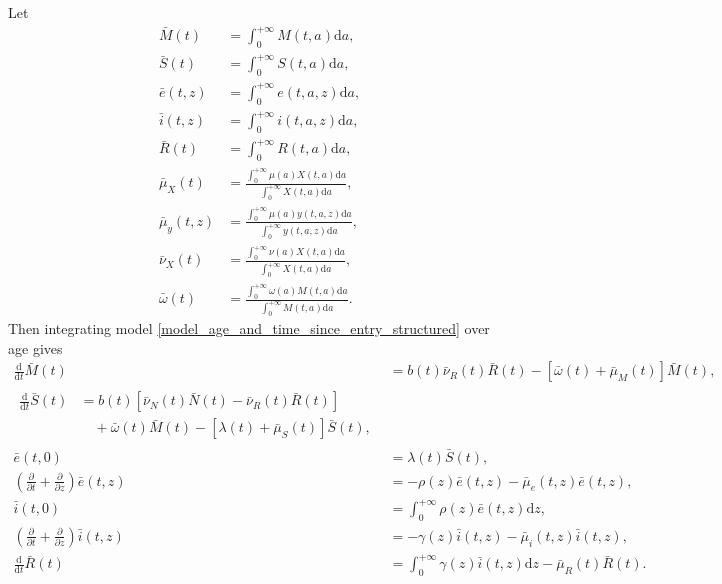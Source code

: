 \documentclass[USenglish]{article}
\newcommand{\md}{\mathrm{d}}
\begin{document}
Let
\begin{subequations}
  \begin{align}
    \bar{M}(t) &= \int_0^{+\infty} M(t, a) \md a,
    \\
    \bar{S}(t) &= \int_0^{+\infty} S(t, a) \md a,
    \\
    \bar{e}(t, z) &= \int_0^{+\infty} e(t, a, z) \md a,
    \\
    \bar{i}(t, z) &= \int_0^{+\infty} i(t, a, z) \md a,
    \\
    \bar{R}(t) &= \int_0^{+\infty} R(t, a) \md a,
    \\
    \bar{\mu}_X(t)
    &= \frac{\int_0^{+\infty} \mu(a) X(t, a) \md a}
    {\int_0^{+\infty} X(t, a) \md a},
    \\
    \bar{\mu}_y(t, z)
    &= \frac{\int_0^{+\infty} \mu(a) y(t, a, z) \md a}
    {\int_0^{+\infty} y(t, a, z) \md a},
    \\
    \bar{\nu}_X(t)
    &= \frac{\int_0^{+\infty} \nu(a) X(t, a) \md a}
    {\int_0^{+\infty} X(t, a) \md a},
    \\
    \bar{\omega}(t)
    &= \frac{\int_0^{+\infty} \omega(a) M(t, a) \md a}
    {\int_0^{+\infty} M(t, a) \md a}.
  \end{align}
\end{subequations}
Then integrating model
\eqref{model_age_and_time_since_entry_structured} over age gives
\begin{subequations}
  \label{model_age_and_time_since_entry_structured_agg_age}
  \begin{align}
    \frac{\md}{\md t} \bar{M}(t)
    &= b(t) \bar{\nu}_R(t) \bar{R}(t)
    - \left[\bar{\omega}(t) + \bar{\mu}_M(t)\right] \bar{M}(t),
    \\
    \begin{split}
      \frac{\md}{\md t} \bar{S}(t)
      &= b(t) \left[
        \bar{\nu}_N(t) \bar{N}(t)
        - \bar{\nu}_R(t) \bar{R}(t)
        \right]
      \\ & \quad {}
      + \bar{\omega}(t) \bar{M}(t)
      - \left[\lambda(t) + \bar{\mu}_S(t)\right] \bar{S}(t),
    \end{split}
    \\
    \bar{e}(t, 0) &=
    \lambda(t) \bar{S}(t),
    \\
    \left(\frac{\partial}{\partial t}
      + \frac{\partial}{\partial z}\right)
    \bar{e}(t, z) &=
    - \rho(z) \bar{e}(t, z) - \bar{\mu}_e(t, z) \bar{e}(t, z),
    \\
    \bar{i}(t, 0) &=
    \int_0^{+\infty} \rho(z) \bar{e}(t, z) \md z,
    \\
    \left(\frac{\partial}{\partial t}
      + \frac{\partial}{\partial z}\right)
    \bar{i}(t, z) &=
    - \gamma(z) \bar{i}(t, z) - \bar{\mu}_i(t, z) \bar{i}(t, z),
    \\
    \frac{\md}{\md t} \bar{R}(t)
    &= \int_0^{+\infty} \gamma(z) \bar{i}(t, z) \md z
    - \bar{\mu}_R(t) \bar{R}(t).
  \end{align}
\end{subequations}
\end{document}
